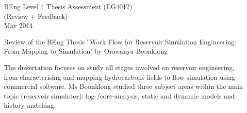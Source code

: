 \documentclass[14pt,twoside]{report}
\begin{document}
\clearpage


\begin{center}
\Huge{BEng Level 4 Thesis Assessment (EG4012)}\\
\huge{(Review + Feedback)}\\
\huge{May 2014}
\end{center}

\vfill

\clearpage





\bigskip

\begin{center}
  {\Large Review of the BEng Thesis $\lq$Work Flow for Reservoir Simulation Engineering: From Mapping to Simulation' by Orawanya Boonklong}
\end{center}

\medskip

The dissertation focuses on study all stages involved on reservoir engineering, from characterising and mapping hydrocarbons fields to flow simulation using commercial software. Ms Boonklong studied three subject areas within the main topic (reservoir simulator): log-/core-analysis, static and dynamic models and history matching. 
\end{document}
